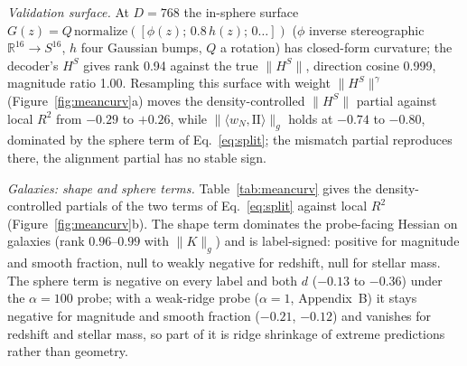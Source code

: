 \documentclass{article}
\newcommand{\Htan}{H^{S}}
\newcommand{\norm}[1]{\lVert #1 \rVert}
\begin{document}
\emph{Validation surface.} At $D=768$ the in-sphere surface $G(z) = Q\,\mathrm{normalize}([\phi(z);\,0.8\,h(z);\,0\ldots])$ ($\phi$ inverse stereographic $\mathbb{R}^{16}\to S^{16}$, $h$ four Gaussian bumps, $Q$ a rotation) has closed-form curvature; the decoder's $\Htan$ gives rank 0.94 against the true $\norm{\Htan}$, direction cosine 0.999, magnitude ratio 1.00. Resampling this surface with weight $\norm{\Htan}^\gamma$ (Figure~\ref{fig:meancurv}a) moves the density-controlled $\norm{\Htan}$ partial against local $R^2$ from $-0.29$ to $+0.26$, while $\norm{\langle w_N,\mathrm{II}\rangle}_g$ holds at $-0.74$ to $-0.80$, dominated by the sphere term of Eq.~\eqref{eq:split}; the mismatch partial reproduces there, the alignment partial has no stable sign.

\emph{Galaxies: shape and sphere terms.} Table~\ref{tab:meancurv} gives the density-controlled partials of the two terms of Eq.~\eqref{eq:split} against local $R^2$ (Figure~\ref{fig:meancurv}b). The shape term dominates the probe-facing Hessian on galaxies (rank $0.96$--$0.99$ with $\norm{K}_g$) and is label-signed: positive for magnitude and smooth fraction, null to weakly negative for redshift, null for stellar mass. The sphere term is negative on every label and both $d$ ($-0.13$ to $-0.36$) under the $\alpha=100$ probe; with a weak-ridge probe ($\alpha=1$, Appendix~B) it stays negative for magnitude and smooth fraction ($-0.21$, $-0.12$) and vanishes for redshift and stellar mass, so part of it is ridge shrinkage of extreme predictions rather than geometry.
\end{document}
